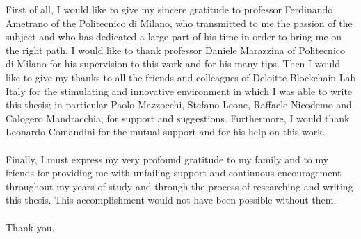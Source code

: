 \documentclass[
11pt, %
oneside, %
english, %
singlespacing, %
toctotoc, %
headsepline, %
]{MastersDoctoralThesis} %
\begin{document}
	\begin{acknowledgements}
		\addchaptertocentry{\acknowledgementname} %
		First of all, I would like to give my sincere gratitude to professor Ferdinando Ametrano of the Politecnico di Milano, who transmitted to me the passion of the subject and who has dedicated a large part of his time in order to bring me on the right path. I would like to thank professor Daniele Marazzina of Politecnico di Milano for his supervision to this work and for his many tips. Then I would like to give my thanks to all the friends and colleagues of Deloitte Blockchain Lab Italy for the stimulating and innovative environment in which I was able to write this thesis; in particular Paolo Mazzocchi, Stefano Leone, Raffaele Nicodemo and Calogero Mandracchia, for support and suggestions. Furthermore, I would thank Leonardo Comandini for the mutual support and for his help on this work.
		\\ \\
		Finally, I must express my very profound gratitude to my family and to my friends for providing me with unfailing support and continuous encouragement throughout my years of study and through the process of researching and writing this thesis. This accomplishment would not have been possible without them. 
		\\ \\
		Thank you.
	\end{acknowledgements}
	
	\hypersetup{%
		colorlinks = true,
		linkcolor  = black
	}
	\tableofcontents %
	
	
	
	
	
	
\end{document}
